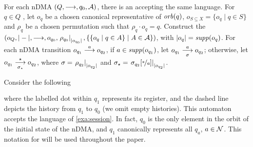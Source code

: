 \begin{proposition}\label{prop:ndma-to-hdma}
For each nDMA $(Q,\overset{}{\longrightarrow},q_0,\mathcal{A})$, there is an \hdma{} accepting the same language.
For $q \in Q$ , let $o_q$ be a chosen canonical representative of $\mathit{orb}(q)$, $o_{S \subseteq X} = \{o_q \mid q \in S\}$ and $\rho_q$ be a chosen permutation such that $\rho_q \cdot o_q = q$.	Construct the \hdma\  $(o_Q,|-|,\overset{}{\underset{}{\longrightarrow}},o_{q_0},\left.\rho_{q_0}\right|_{|o_{q_0}|},\{ \{ o_q \mid q \in A\} \mid A \in \mathcal{A} \})$, 
%
with $|o_q| = \mathit{supp}(o_q)$. For each nDMA transition $o_{q_1} \overset{a}{\longrightarrow} o_{q_2}$, if $a \in \mathit{supp}(o_{q_1})$, let $o_{q_1} \overset{a}{\underset{\sigma}{\longrightarrow}} o_{q_2}$; otherwise, let $o_{q_1} \overset{\star}{\underset{\sigma_\star}{\longrightarrow}} o_{q_2}$, where $\sigma=\left.\rho_{q_2}\right|_{|o_{q_2}|}$ and $\sigma_\star = \left.\sigma_{q_2}[\nicefrac{*}{a}]\right|_{|o_{q_2}|}$.
\end{proposition}


\begin{example}
Consider the following \hdma{} 

\begin{center}
\end{center}
%
where the labelled dot within $q_1$ represents its register, and the dashed line depicts the history from $q_1$ to $q_0$ (we omit empty histories). This automaton accepts the language of \cref{exa:session}. In fact, $q_0$ is the only element in the orbit of the initial state of the nDMA, and $q_1$ canonically represents all $q_a$, $a \in \mathcal{N}$. This notation for \hdmas{} will be used throughout the paper.\end{example}



% 
